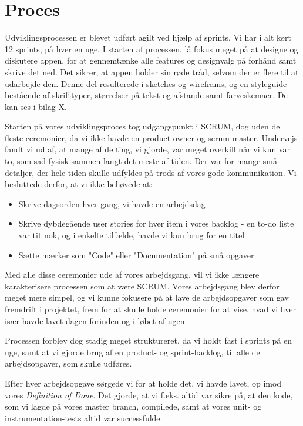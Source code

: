 \section{Proces}
Udviklingsprocessen er blevet udført agilt ved hjælp af sprints. Vi har i alt kørt 12 sprints, på hver en uge. I starten af processen, lå fokus meget på at designe og diskutere appen, for at gennemtænke alle features og designvalg på forhånd samt skrive det ned. Det sikrer, at appen holder sin røde tråd, selvom der er flere til at udarbejde den. Denne del resulterede i sketches og wireframs, og en styleguide bestående af skrifttyper, størrelser på tekst og afstande samt farveskemaer. De kan ses i bilag X.

Starten på vores udviklingsproces tog udgangspunkt i SCRUM, dog uden de fleste ceremonier, da vi ikke havde en product owner og scrum master. Undervejs fandt vi ud af, at mange af de ting, vi gjorde, var meget overkill når vi kun var to, som sad fysisk sammen langt det meste af tiden. Der var for mange små detaljer, der hele tiden skulle udfyldes på trods af vores gode kommunikation. Vi besluttede derfor, at vi ikke behøvede at:

\begin{itemize}
   \item Skrive dagsorden hver gang, vi havde en arbejdsdag
   \item Skrive dybdegående user stories for hver item i vores backlog - en to-do liste var tit nok, og i enkelte tilfælde, havde vi kun brug for en titel
   \item Sætte mærker som "Code" eller "Documentation" på små opgaver
\end{itemize}

Med alle disse ceremonier ude af vores arbejdsgang, vil vi ikke længere karakterisere processen som at være SCRUM.
Vores arbejdsgang blev derfor meget mere simpel, og vi kunne fokusere på at lave de arbejdsopgaver som gav fremdrift i projektet, frem for at skulle holde ceremonier for at vise, hvad vi hver især havde lavet dagen forinden og i løbet af ugen. 

Processen forblev dog stadig meget struktureret, da vi holdt fast i sprints på en uge, samt at vi gjorde brug af en product- og sprint-backlog, til alle de arbejdsopgaver, som skulle udføres. 

Efter hver arbejdsopgave sørgede vi for at holde det, vi havde lavet, op imod vores \textit{Definition of Done}. Det gjorde, at vi f.eks. altid var sikre på, at den kode, som vi lagde på vores master branch, compilede, samt at vores unit- og instrumentation-tests altid var successfulde.

